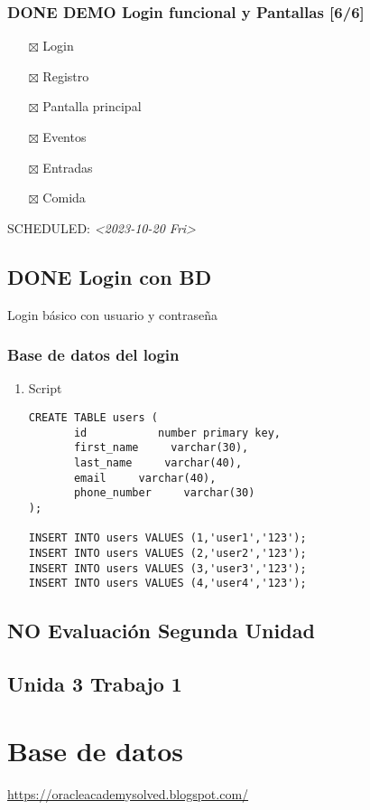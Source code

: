 \documentclass[11pt]{article}
\begin{document}
\subsubsection{{\bfseries\sffamily DONE} DEMO Login funcional y Pantallas [6/6]}
\label{sec:orga113f91}
\begin{itemize}
\item[{$\boxtimes$}] Login
\item[{$\boxtimes$}] Registro
\item[{$\boxtimes$}] Pantalla principal
\item[{$\boxtimes$}] Eventos
\item[{$\boxtimes$}] Entradas
\item[{$\boxtimes$}] Comida
\end{itemize}
SCHEDULED: \textit{<2023-10-20 Fri>}
\subsection{{\bfseries\sffamily DONE} Login con BD}
\label{sec:org8abadde}
Login básico con usuario y contraseña
\subsubsection{Base de datos del login}
\label{sec:org8e02f81}
\begin{enumerate}
\item Script
\label{sec:orgf691ca2}
\begin{verbatim}
CREATE TABLE users (
       id           number primary key,
       first_name     varchar(30),
       last_name     varchar(40),
       email     varchar(40),
       phone_number     varchar(30)
);

INSERT INTO users VALUES (1,'user1','123');
INSERT INTO users VALUES (2,'user2','123');
INSERT INTO users VALUES (3,'user3','123');
INSERT INTO users VALUES (4,'user4','123');
\end{verbatim}
\end{enumerate}
\subsection{{\bfseries\sffamily NO} Evaluación Segunda Unidad}
\label{sec:org65fe474}
\subsection{Unida 3 Trabajo 1}
\label{sec:orgc312c61}
\section{Base de datos}
\label{sec:orgdf95749}
\url{https://oracleacademysolved.blogspot.com/}
\end{document}
